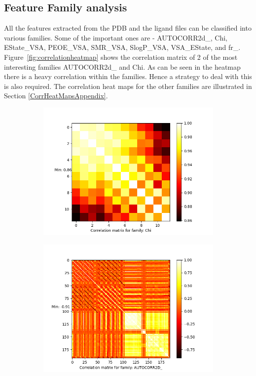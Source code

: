 \documentclass[11pt]{article}
\begin{document}
\subsection{Feature Family analysis}
\label{CorrelationAnalysis}
All the features extracted from the PDB and the ligand files can be classified into various families.
Some of the important ones are - AUTOCORR2d\_, Chi, EState\_VSA,  PEOE\_VSA,  SMR\_VSA,  SlogP\_VSA,  VSA\_EState, and fr\_.
Figure~\ref{fig:correlationheatmap} shows the correlation matrix of 2 of the most interesting families AUTOCORR2d\_ and Chi.
As can be seen in the heatmap there is a heavy correlation within the families.
Hence a strategy to deal with this is also required.
The correlation heat maps for the other families are illustrated in Section \ref{CorrHeatMapsAppendix}.

\begin{figure}[htb]
    \begin{subfigure}[b]{0.45\textwidth}
         \centering
         \includegraphics[scale=0.45]{images/correlationChi}
        \label{fig:correlationChi}
     \end{subfigure}
     \hfill
    \begin{subfigure}[b]{0.45\textwidth}
         \centering
         \includegraphics[scale=0.45]{images/correlationAUTOCORR2D}

\end{subfigure}
\end{figure}
\end{document}
